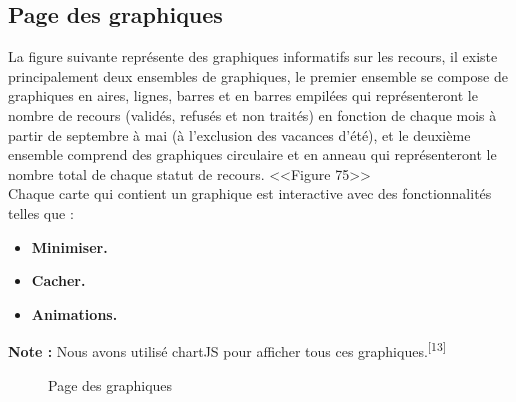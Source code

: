 \documentclass[12pt]{report}
\begin{document}
\newpage

\subsection{Page des graphiques}

La figure suivante représente des graphiques informatifs sur les recours, il existe principalement deux ensembles de graphiques, le premier ensemble se compose de graphiques en aires, lignes, barres et en barres empilées qui représenteront le nombre de recours (validés, refusés et non traités) en fonction de chaque mois à partir de septembre à mai (à l'exclusion des vacances d'été), et le deuxième ensemble comprend des graphiques circulaire et en anneau qui représenteront le nombre total de chaque statut de recours. <<Figure 75>>
\\
Chaque carte qui contient un graphique est interactive avec des fonctionnalités telles que :
\begin{itemize}
  \item \textbf{Minimiser.}
  \item \textbf{Cacher.}
  \item \textbf{Animations.}
\end{itemize}

\textbf{Note :} Nous avons utilisé chartJS pour afficher tous ces graphiques.\textsuperscript{[13]}

\vspace{0.3in}

\begin{figure}[H]
\centering
\caption{Page des graphiques}
\end{figure}
\end{document}
